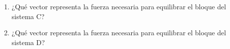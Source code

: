 \documentclass[11pt]{book}
\begin{document}
\begin{itemize}
\begin{boxK}
\begin{enumerate}
\begin{hoptboxes}
                  \end{hoptboxes}
            \item ¿Qué vector representa la fuerza necesaria para equilibrar el bloque del
                  sistema C?\\
            \item ¿Qué vector representa la fuerza necesaria para equilibrar el bloque del
                  sistema D?\\
          \end{enumerate}
        \end{boxK}



\end{itemize}
\end{document}
